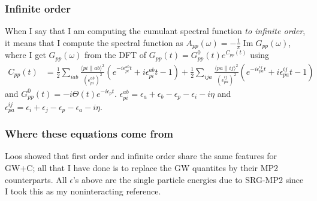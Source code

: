 \subsubsection{Infinite order}
When I say that I am computing the cumulant spectral function \emph{to infinite order}, it means that I compute the spectral function as $A_{pp}(\omega) = -\frac{1}{\pi} \operatorname{Im} G_{pp}(\omega)$, where I get $G_{pp}(\omega)$ from the DFT of $G_{pp}(t) = G_{pp}^{0}(t) e^{C_{pp}(t)}$ using
\begin{align}
C_{pp}(t) & = \frac{1}{2} \sum_{i a b}\frac{\langle p i \| a b\rangle^2 }{\left(\epsilon_{p i}^{a b}\right)^2}\left(e^{-i \epsilon_{p i}^{a b} t} +i \epsilon_{p i}^{a b} t -1 \right) +\frac{1}{2}\sum_{i j a} \frac{\langle p a \| i j\rangle^2}{\left(\epsilon_{p a}^{i j}\right)^2} \left(e^{-i \epsilon_{p a}^{i j} t} +i \epsilon_{p a}^{i j} t -1 \right)
\end{align}
and $G_{pp}^{0}(t) = -i \Theta(t) e^{-i \epsilon_p t}$. $\epsilon_{pi}^{ab} = \epsilon_{a}+\epsilon_{b}-\epsilon_{p}-\epsilon_{i} - i\eta$ and $\epsilon_{pa}^{ij} = \epsilon_{i}+\epsilon_{j}-\epsilon_{p}-\epsilon_{a} - i\eta$.
\subsubsection{Where these equations come from}
Loos showed that first order and infinite order share the same features for GW+C; all that I have done is to replace the GW quantites by their MP2 counterparts.  All $\epsilon$'s above are the single particle energies due to SRG-MP2 since I took this as my noninteracting reference.

